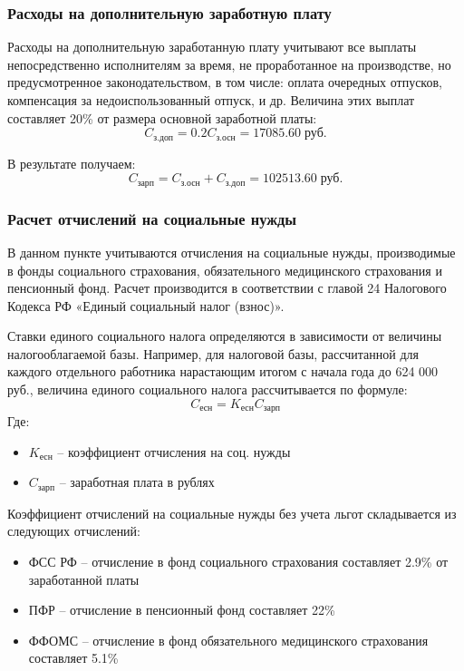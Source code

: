 \documentclass[russian,utf8,emptystyle]{eskdtext}
\begin{document}
\begin{spacing}{1.5}
\subsubsection{Расходы на дополнительную заработную плату}
Расходы на дополнительную заработанную плату учитывают все выплаты непосредственно исполнителям за время, не проработанное на производстве, но предусмотренное законодательством, в том числе: оплата очередных отпусков, компенсация за недоиспользованный отпуск, и др. Величина этих выплат составляет 20\% от размера основной заработной платы:	
$$
C_\text{з.доп} = 0.2 C_\text{з.осн} = 17085.60 \; \text{руб.}
$$

В результате получаем:
$$
C_\text{зарп} = C_\text{з.осн} + C_\text{з.доп} = 102513.60 \; \text{руб.}
$$

\subsubsection{Расчет отчислений на социальные нужды}
В данном пункте учитываются отчисления на социальные нужды, производимые в фонды социального страхования, обязательного медицинского страхования и пенсионный фонд. Расчет производится в соответствии с главой 24 Налогового Кодекса РФ «Единый социальный налог (взнос)». 

Ставки единого социального налога определяются в зависимости от величины налогооблагаемой базы. Например, для налоговой базы, рассчитанной для каждого отдельного работника нарастающим итогом с начала года до 624 000 руб., величина единого социального налога рассчитывается по формуле:
$$
C_\text{есн} = K_\text{есн} C_\text{зарп}
$$
Где:
\begin{itemize}
\item $K_\text{есн}$ -- коэффициент отчисления на соц. нужды
\item $C_\text{зарп}$ -- заработная плата в рублях
\end{itemize}

Коэффициент отчислений на социальные нужды без учета льгот складывается из следующих отчислений:
\begin{itemize}
\item ФСС РФ -- отчисление в фонд социального страхования составляет 2.9\% от заработанной платы
\item ПФР -- отчисление в пенсионный фонд составляет 22\%
\item ФФОМС -- отчисление в фонд обязательного медицинского страхования составляет 5.1\%
\end{itemize}


\end{spacing}
\end{document}
